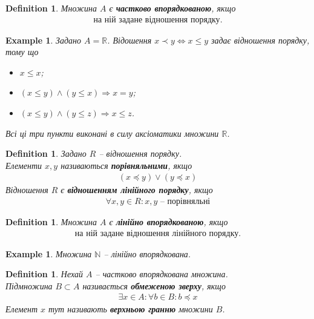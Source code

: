 \documentclass[a4paper, 14pt]{extarticle}
\theoremstyle{theoremdd}
\theoremstyle{theoremdd}
\newtheorem{definition}[theorem]{Definition}
\theoremstyle{theoremdd}
\theoremstyle{theoremdd}
\theoremstyle{theoremdd}
\newtheorem{example}[theorem]{Example}
\theoremstyle{theoremdd}
\theoremstyle{theoremdd}
\theoremstyle{theoremdd}
\theoremstyle{theoremdd}
\theoremstyle{theoremdd}
\theoremstyle{theoremdd}
\theoremstyle{theoremdd}
\theoremstyle{theoremdd}
\theoremstyle{theoremdd}
\theoremstyle{theoremdd}
\begin{document}
\begin{definition}
Множина $A$ є \textbf{частково впорядкованою}, якщо
\begin{align*}
\text{на ній задане відношення порядку}.
\end{align*}
\end{definition}

\begin{example}
Задано $A = \mathbb{R}$. Відошення $x \prec y \iff x \leq y$ задає відношення порядку, тому що
\begin{itemize}[nosep,wide=0pt,label={-}]
\item $x \leq x$;
\item $(x \leq y) \wedge (y \leq x) \Rightarrow x = y$;
\item $(x \leq y) \wedge (y \leq z) \Rightarrow x \leq z$.
\end{itemize}
Всі ці три пункти виконані в силу аксіоматики множини $\mathbb{R}$.
\end{example}

\begin{definition}
Задано $R$ -- відношення порядку.\\
Елементи $x,y$ називаються \textbf{порівняльними}, якщо
\begin{align*}
(x \preceq y) \vee (y \preceq x)
\end{align*}
Відношення $R$ є \textbf{відношенням лінійного порядку}, якщо
\begin{align*}
\forall x,y \in R: x,y \text{ -- порівняльні}
\end{align*}
\end{definition}

\begin{definition}
Множина $A$ є \textbf{лінійно впорядкованою}, якщо
\begin{align*}
\text{на ній задане відношення лінійного порядку}.
\end{align*}
\end{definition}

\begin{example}
Множина $\mathbb{N}$ -- лінійно впорядкована.
\end{example}

\begin{definition}
Нехай $A$ -- частково впорядкована множина.\\
Підмножина $B \subset A$ називається \textbf{обмеженою зверху}, якщо
\begin{align*}
\exists x \in A: \forall b \in B: b \preceq x
\end{align*}
Елемент $x$ тут називають \textbf{верхньою гранню} множини $B$.
\end{definition}
\end{document}
